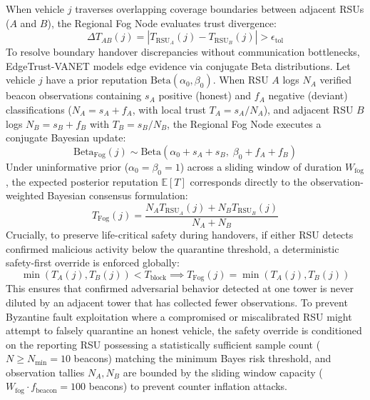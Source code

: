 \documentclass[conference]{IEEEtran}
\begin{document}
When vehicle $j$ traverses overlapping coverage boundaries between adjacent RSUs ($A$ and $B$), the Regional Fog Node evaluates trust divergence:
\begin{equation}
\Delta T_{AB}(j) = |T_{\text{RSU}_A}(j) - T_{\text{RSU}_B}(j)| > \epsilon_{\text{tol}}
\label{eq:divergence}
\end{equation}
To resolve boundary handover discrepancies without communication bottlenecks, EdgeTrust-VANET models edge evidence via conjugate Beta distributions. Let vehicle $j$ have a prior reputation $\text{Beta}(\alpha_0, \beta_0)$. When RSU $A$ logs $N_A$ verified beacon observations containing $s_A$ positive (honest) and $f_A$ negative (deviant) classifications ($N_A = s_A + f_A$, with local trust $T_A = s_A/N_A$), and adjacent RSU $B$ logs $N_B = s_B + f_B$ with $T_B = s_B/N_B$, the Regional Fog Node executes a conjugate Bayesian update:
\begin{equation}
\text{Beta}_{\text{Fog}}(j) \sim \text{Beta}\left(\alpha_0 + s_A + s_B, \; \beta_0 + f_A + f_B\right)
\label{eq:beta_update}
\end{equation}
Under uninformative prior ($\alpha_0 = \beta_0 = 1$) across a sliding window of duration $W_{\text{fog}}$, the expected posterior reputation $\mathbb{E}[T]$ corresponds directly to the observation-weighted Bayesian consensus formulation:
\begin{equation}
T_{\text{Fog}}(j) = \frac{N_A T_{\text{RSU}_A}(j) + N_B T_{\text{RSU}_B}(j)}{N_A + N_B}
\label{eq:fog_consensus}
\end{equation}
Crucially, to preserve life-critical safety during handovers, if either RSU detects confirmed malicious activity below the quarantine threshold, a deterministic safety-first override is enforced globally:
\begin{equation}
\min(T_A(j), T_B(j)) < T_{\text{block}} \implies T_{\text{Fog}}(j) = \min(T_A(j), T_B(j))
\label{eq:safety_override}
\end{equation}
This ensures that confirmed adversarial behavior detected at one tower is never diluted by an adjacent tower that has collected fewer observations. To prevent Byzantine fault exploitation where a compromised or miscalibrated RSU might attempt to falsely quarantine an honest vehicle, the safety override is conditioned on the reporting RSU possessing a statistically sufficient sample count ($N \ge N_{\text{min}} = 10$ beacons) matching the minimum Bayes risk threshold, and observation tallies $N_A, N_B$ are bounded by the sliding window capacity ($W_{\text{fog}} \cdot f_{\text{beacon}} = 100$ beacons) to prevent counter inflation attacks.
\end{document}
